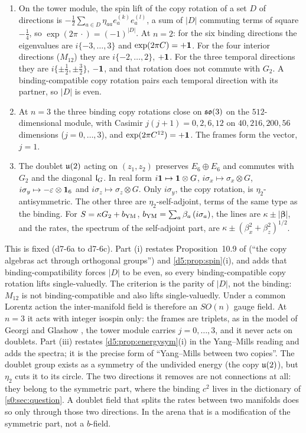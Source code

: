 \begin{proposition}
\label{d7:prop:isospin}
\begin{enumerate}[label=(\roman*),leftmargin=2.2em]
\item On the tower module, the spin lift of the copy rotation of a set $D$ of directions is $-\tfrac12\sum_{a\in D}\eta_{aa}e^{(k)}_ae^{(l)}_a$, a sum of $|D|$
commuting terms of square $-\tfrac14$, so $\exp(2\pi\,\cdot)=(-1)^{|D|}$. At $n=2$: for the six binding directions the eigenvalues are $i\{-3,\dots,3\}$ and
$\exp(2\pi C)=+\mathbf 1$. For the four interior directions ($M_{12}$) they are $i\{-2,\dots,2\}$, $+\mathbf 1$. For the three temporal directions they are
$i\{\pm\tfrac12,\pm\tfrac32\}$, $-\mathbf 1$, and that rotation does not commute with $G_2$. A binding-compatible copy rotation pairs each temporal direction with
its partner, so $|D|$ is even.
\item At $n=3$ the three binding copy rotations close on $\mathfrak{so}(3)$ on the $512$-dimensional module, with Casimir $j(j+1)=0,2,6,12$ on $40,216,200,56$
dimensions ($j=0,\dots,3$), and $\exp(2\pi C^{12})=+\mathbf 1$. The frames form the vector, $j=1$.
\item The doublet $\mathfrak{u}(2)$ acting on $(z_1,z_2)$ preserves $E_6\oplus E_6$ and commutes with $G_2$ and the diagonal $\mathfrak l_G$. In real form $i\mathbf 1\mapsto\mathbf 1\otimes G$,
$i\sigma_x\mapsto\sigma_x\otimes G$, $i\sigma_y\mapsto-\varepsilon\otimes\mathbf 1_6$ and $i\sigma_z\mapsto\sigma_z\otimes G$. Only $i\sigma_y$, the copy rotation, is
$\eta_2$-antisymmetric. The other three are $\eta_2$-self-adjoint, terms of the same type as the binding. For $S=\kappa G_2+b_{\rm YM}$,
$b_{\rm YM}=\sum_a\beta_a\,(i\sigma_a)$, the lines are $\kappa\pm|\boldsymbol\beta|$, and the rates, the spectrum of the self-adjoint part, are
$\kappa\pm(\beta_x^2+\beta_z^2)^{1/2}$.
\end{enumerate}
\end{proposition}

This is fixed (d7-6a to d7-6c). Part (i) restates Proposition~10.9 of \cite{ES17} (``the copy algebras act through orthogonal groups'') and
\cref{d5:prop:spin}(i), and adds that binding-compatibility forces $|D|$ to be even, so every binding-compatible copy rotation lifts single-valuedly. The criterion is the parity of $|D|$, not the binding: $M_{12}$ is not binding-compatible and also lifts single-valuedly. Under a common Lorentz action the inter-manifold field
is therefore an $SO(n)$ gauge field. At $n=3$ it acts with integer isospin only: the frames are triplets, as in the model of Georgi and Glashow \cite{GeorgiGlashow72}, the tower module carries $j=0,\dots,3$, and it never acts on
doublets. Part (iii) restates \cref{d5:prop:energysym}(i) in the Yang--Mills reading and adds the spectra; it is the precise form of
``Yang--Mills between two copies''. The doublet group exists as a symmetry of the undivided energy
(the copy $\mathfrak{u}(2)$), but $\eta_2$ cuts it to its circle. The two directions it removes are not connections at all:
they belong to the symmetric part, where the binding $c^2$ lives in the dictionary of \cref{s0:sec:question}. A doublet field that splits the
rates between two manifolds does so only through those two directions. In the arena that is a modification of the symmetric part, not a
$b$-field.

